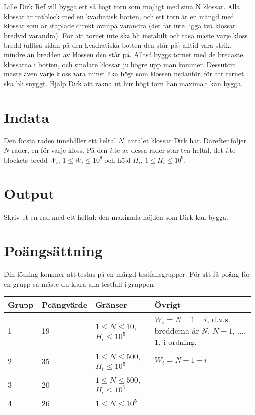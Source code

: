 Lille Dirk Ref vill bygga ett så högt torn som möjligt med sina N klossar. Alla klossar är rätblock med en kvadratisk botten, och ett torn är en mängd med klossar som är staplade direkt ovanpå varandra (det får inte ligga två klossar bredvid varandra). För att tornet inte ska bli instabilt och rasa måste varje kloss bredd (alltså sidan på den kvadratiska botten den står på) alltid vara strikt mindre än bredden av klossen den står på. Alltså byggs tornet med de bredaste klossarna i botten, och smalare klossar ju högre upp man kommer. Dessutom måste även varje kloss vara minst lika högt som klossen nedanför, för att tornet ska bli snyggt. Hjälp Dirk att räkna ut hur högt torn han maximalt kan bygga.

\section*{Indata}
Den första raden innehåller ett heltal $N$, antalet klossar Dirk har. Därefter följer $N$ rader, en för varje kloss. På den $i$:te av dessa rader står två heltal, det $i$:te blockets bredd $W_i$, $1 \leq W_i \leq 10^9$ och höjd $H_i$, $1 \leq H_i \leq 10^9$.

\section*{Output}
Skriv ut en rad med ett heltal: den maximala höjden som Dirk kan bygga.

\section*{Poängsättning}
Din lösning kommer att testas på en mängd testfallsgrupper. För att få poäng för en grupp så måste du klara alla testfall i gruppen.

\begin{tabular}{|l|l|l|l|}
\hline
Grupp & Poängvärde & Gränser & Övrigt \\ \hline
1     & 19         & $1 \leq N \leq 10$, $H_i \le 10^5$ & $W_i = N+1 - i$, d.v.s. bredderna är $N$, $N-1$, $\dots$, $1$, i ordning. \\ \hline
2     & 35         & $1 \leq N \leq 500$, $H_i \le 10^5$ & $W_i = N+1 - i$ \\ \hline
3     & 20         & $1 \leq N \leq 500$, $H_i \le 10^5$ & \\ \hline
4     & 26         & $1 \leq N \leq 10^5$ & \\ \hline
\end{tabular}
